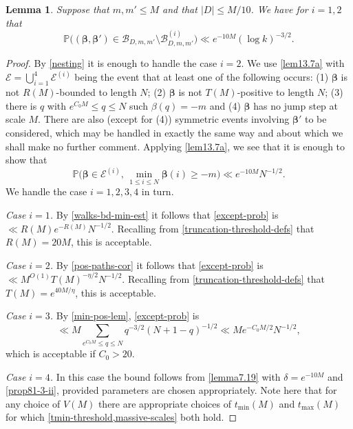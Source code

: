 \documentclass[11pt,reqno]{amsart}
\numberwithin{equation}{section}
\newtheorem{lemma}[theorem]{Lemma}
\theoremstyle{definition}
\theoremstyle{remark}
\newcommand{\mb}{\mathbb}
\def\boldbeta{\boldsymbol\beta}
\renewcommand{\le}{\leqslant}
\renewcommand{\ge}{\geqslant}
\begin{document}
\begin{lemma} \label{exceptions-bd} Suppose that $m , m' \le M$ and that $|D| \le M/10$. We have for $i = 1,2$ that
\[ \mb{P} \big((\boldbeta, \boldbeta') \in \mathscr{B}_{D,m,m'} \setminus \mathscr{B}^{(i)}_{D,m,m'}\big) \ll e^{-10M} (\log k)^{-3/2}.\]
\end{lemma}
\begin{proof}
By \cref{nesting} it is enough to handle the case $i = 2$. We use \cref{lem13.7a} with $\mathcal{E} = \bigcup_{i = 1}^4 \mathcal{E}^{(i)}$ being the event that at least one of the following occurs: (1) $\boldbeta$ is not $R(M)$-bounded to length $N$; (2) $\boldbeta$ is not $T(M)$-positive to length $N$; (3) there is $q$ with $e^{C_0 M} \le q\le N$ such $\beta(q) = -m$ and (4) $\boldbeta$ has no jump step at scale $M$. There are also (except for (4)) symmetric events involving $\boldbeta'$ to be considered, which may be handled in exactly the same way and about which we shall make no further comment. Applying \cref{lem13.7a}, we see that it is enough to show that 
\begin{equation}\label{except-prob} \mb{P}\big( \boldbeta \in \mathcal{E}^{(i)} ,\, \min_{1 \le i \le N} \boldbeta(i) \ge -m\big) \ll e^{-10M} N^{-1/2}.\end{equation}
We handle the case $i = 1,2,3,4$ in turn. \vspace*{8pt}

\emph{Case $i = 1$.} By \cref{walks-bd-min-est} it follows that \cref{except-prob} is $\ll R(M) e^{-R(M)} N^{-1/2}$. Recalling from \cref{truncation-threshold-defs} that $R(M) = 20 M$, this is acceptable.\vspace*{8pt}

\emph{Case $i = 2$.} By \cref{pos-paths-cor} it follows that \cref{except-prob} is $\ll M^{O(1)} T(M)^{-\eta/2}N^{-1/2}$. Recalling from \cref{truncation-threshold-defs} that $T(M) = e^{40M/\eta}$, this is acceptable.\vspace*{8pt}

\emph{Case $i = 3$.} By \cref{min-pos-lem}, \cref{except-prob} is 
\[ \ll M \sum_{e^{C_0 M} \le q \le N} q^{-3/2}(N + 1 - q)^{-1/2} \ll M e^{-C_0 M/2}N^{-1/2},\] which is acceptable if $C_0 > 20$.
\vspace*{8pt}

\emph{Case $i = 4$.} In this case the bound follows from  \cref{lemma7.19} with $\delta = e^{-10M}$ and \cref{prop81-3-ii}, provided parameters are chosen appropriately. Note here that for any choice of $V(M)$ there are appropriate choices of $t_{\min}(M)$ and $t_{\max}(M)$ for which \cref{tmin-threshold,massive-scales} both hold.
\end{proof}
\end{document}
